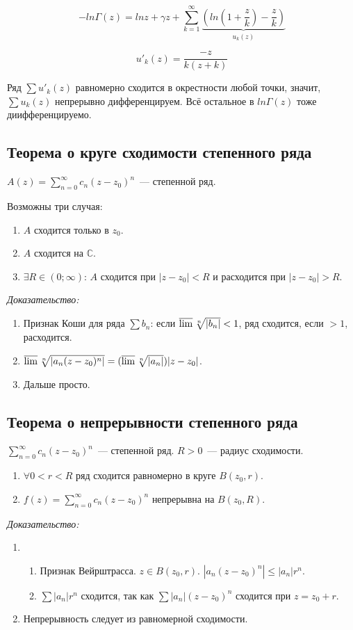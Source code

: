 \documentclass[paper=a4, fontsize=11pt]{article}
\begin{document}
$$-ln \Gamma(z) = ln z + \gamma z + \sum_{k=1}^{\infty} \underbrace{(ln(1+\frac{z}{k}) - \frac{z}{k})}_{u_k(z)}$$

$$u'_k(z) = \frac{-z}{k(z+k)}$$

Ряд $\sum u'_k(z)$ равномерно сходится в окрестности любой точки, значит, $\sum u_k(z)$ непрерывно дифференцируем.
Всё остальное в $ln \Gamma(z)$ тоже диифференцируемо.

\subsection{Теорема о круге сходимости степенного ряда}
$A(z)=\sum_{n=0}^{\infty}c_n(z-z_0)^n$~--- степенной ряд.

Возможны три случая:
\begin{enumerate}
    \item $A$ сходится только в $z_0$.
    \item $A$ сходится на $\mathds{C}$.
    \item $\exists R \in (0;\infty)$: $A$ сходится при $|z-z_0|<R$ и расходится при $|z-z_0|>R$.
\end{enumerate}

\emph{Доказательство:}
\begin{enumerate}
    \item Признак Коши для ряда $\sum b_n$: если $\varlimsup \sqrt[n]{|b_n|} < 1$, ряд сходится, если $> 1$, расходится.
    \item $\varlimsup \sqrt[n]{|a_n(z-z_0)^n|} = (\varlimsup \sqrt[n]{|a_n|})|z-z_0|$.
    \item Дальше просто.
\end{enumerate}

\subsection{Теорема о непрерывности степенного ряда}
$\sum_{n=0}^{\infty}c_n(z-z_0)^n$~--- степенной ряд. $R>0$~--- радиус сходимости.
\begin{enumerate}
    \item $\forall 0<r<R$ ряд сходится равномерно в круге $B(z_0,r)$.
    \item $f(z)=\sum_{n=0}^{\infty}c_n(z-z_0)^n$ непрерывна на $B(z_0,R)$.
\end{enumerate}

\emph{Доказательство:}
\begin{enumerate}
    \item
    \begin{enumerate}
        \item Признак Вейрштрасса. $z \in B(z_0,r)$. $|a_n(z-z_0)^n| \leq |a_n|r^n$.
        \item $\sum |a_n|r^n$ сходится, так как $\sum |a_n|(z-z_0)^n$ сходится при $z=z_0+r$.
    \end{enumerate}
    \item Непрерывность следует из равномерной сходимости.
\end{enumerate}
\end{document}
